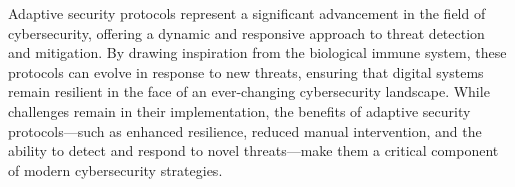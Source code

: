 \documentclass[12pt,twoside]{article}
\begin{document}
Adaptive security protocols represent a significant advancement in the field of cybersecurity, offering a dynamic and responsive approach to threat detection and mitigation. By drawing inspiration from the biological immune system, these protocols can evolve in response to new threats, ensuring that digital systems remain resilient in the face of an ever-changing cybersecurity landscape. While challenges remain in their implementation, the benefits of adaptive security protocols—such as enhanced resilience, reduced manual intervention, and the ability to detect and respond to novel threats—make them a critical component of modern cybersecurity strategies.
\end{document}
